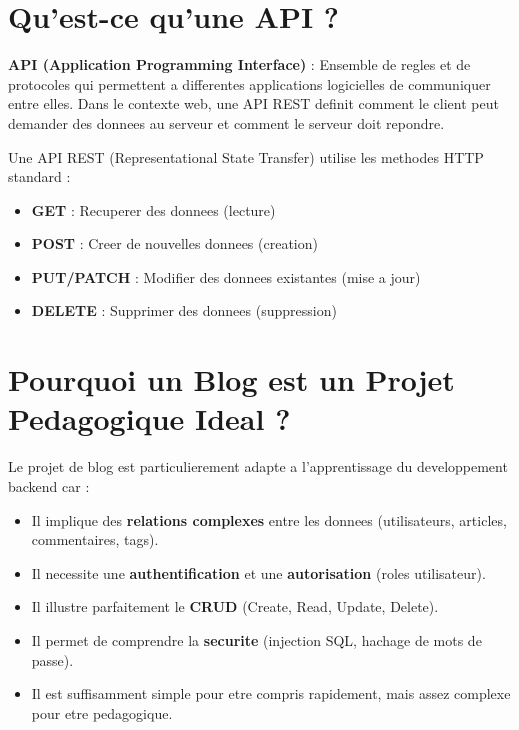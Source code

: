 \documentclass[a4paper,12pt]{book}
\begin{document}
\section{Qu'est-ce qu'une API ?}

\begin{definitionbox}
    \textbf{API (Application Programming Interface)} : Ensemble de regles et de protocoles qui permettent a differentes applications logicielles de communiquer entre elles. Dans le contexte web, une API REST definit comment le client peut demander des donnees au serveur et comment le serveur doit repondre.
\end{definitionbox}

Une API REST (Representational State Transfer) utilise les methodes HTTP standard :
\begin{itemize}
    \item \textbf{GET} : Recuperer des donnees (lecture)
    \item \textbf{POST} : Creer de nouvelles donnees (creation)
    \item \textbf{PUT/PATCH} : Modifier des donnees existantes (mise a jour)
    \item \textbf{DELETE} : Supprimer des donnees (suppression)
\end{itemize}

\section{Pourquoi un Blog est un Projet Pedagogique Ideal ?}

Le projet de blog est particulierement adapte a l'apprentissage du developpement backend car :

\begin{itemize}
    \item Il implique des \textbf{relations complexes} entre les donnees (utilisateurs, articles, commentaires, tags).
    \item Il necessite une \textbf{authentification} et une \textbf{autorisation} (roles utilisateur).
    \item Il illustre parfaitement le \textbf{CRUD} (Create, Read, Update, Delete).
    \item Il permet de comprendre la \textbf{securite} (injection SQL, hachage de mots de passe).
    \item Il est suffisamment simple pour etre compris rapidement, mais assez complexe pour etre pedagogique.
\end{itemize}
\end{document}
